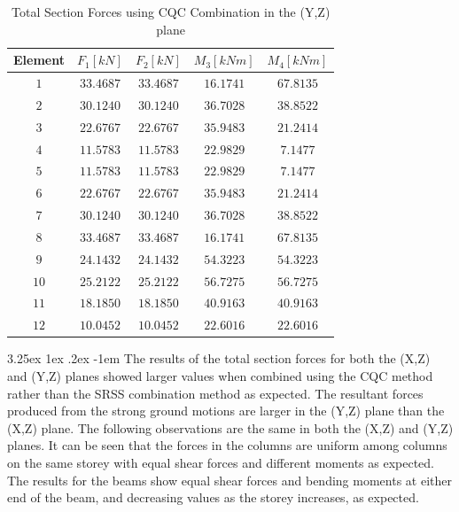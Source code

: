 \documentclass[11pt,a4paper,titlepage]{report}
\makeatletter
\renewcommand\paragraph{\@startsection{paragraph}{5}{\z@}%
  {3.25ex \@plus1ex \@minus.2ex}%
  {-1em}%
  {\normalfont\normalsize\bfseries}}
\makeatother
\begin{document}
\begin{table}[h]
    \centering
    \begin{tabular}{c|c|c|c|c}
    Element & $F_1 [kN]$ & $F_2 [kN]$ & $M_3 [kNm]$ & $M_4 [kNm]$ \\
    \hline
       $1$ & $33.4687$ & $33.4687$ & $16.1741$ & $67.8135$ \\
       $2$ & $30.1240$ & $30.1240$ & $36.7028$ & $38.8522$ \\
       $3$ & $22.6767$ & $22.6767$ & $35.9483$ & $21.2414$ \\
       $4$ & $11.5783$ & $11.5783$ & $22.9829$ & $7.1477$ \\
       $5$ & $11.5783$ & $11.5783$ & $22.9829$ & $7.1477$ \\
       $6$ & $22.6767$ & $22.6767$ & $35.9483$ & $21.2414$ \\
       $7$ & $30.1240$ & $30.1240$ & $36.7028$ & $38.8522$ \\
       $8$ & $33.4687$ & $33.4687$ & $16.1741$ & $67.8135$ \\
       $9$ & $24.1432$ & $24.1432$ & $54.3223$ & $54.3223$ \\
       $10$ & $25.2122 $ & $25.2122 $ & $ 56.7275 $ & $ 56.7275 $ \\
       $11$ & $18.1850$ & $18.1850$ & $ 40.9163 $ & $ 40.9163 $ \\
       $12$ & $ 10.0452$ & $ 10.0452$ & $22.6016$ & $22.6016$ \\
    \end{tabular}
    \caption{Total Section Forces using CQC Combination in the (Y,Z) plane}
    \label{tab:totl section forces CQC Y}
\end{table}
\paragraph{}The results of the total section forces for both the (X,Z) and (Y,Z) planes showed larger values when combined using the CQC method rather than the SRSS combination method as expected. The resultant forces produced from the strong ground motions are larger in the (Y,Z) plane than the (X,Z) plane. The following observations are the same in both the (X,Z) and (Y,Z) planes. It can be seen that the forces in the columns are uniform among columns on the same storey with equal shear forces and different moments as expected. The results for the beams show equal shear forces and bending moments at either end of the beam, and decreasing values as the storey increases, as expected. 
\end{document}
